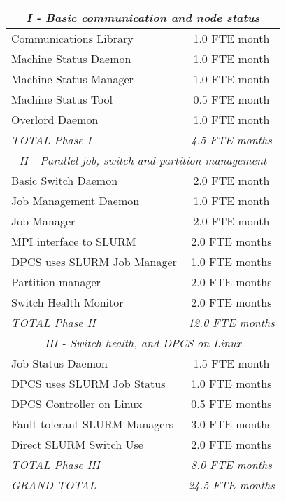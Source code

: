 \begin{center}
\begin{tabular}{|l|c|}\hline
\multicolumn{2}{|c|}{\em I - Basic communication and node status} \\ \hline
Communications Library          & 1.0 FTE month \\
Machine Status Daemon           & 1.0 FTE month \\
Machine Status Manager          & 1.0 FTE month \\
Machine Status Tool             & 0.5 FTE month \\
Overlord Daemon                 & 1.0 FTE month \\
{\em TOTAL Phase I}		& {\em 4.5 FTE months} \\ \hline
\multicolumn{2}{|c|}{\em II - Parallel job, switch and partition management} \\ \hline
Basic Switch Daemon             & 2.0 FTE month \\
Job Management Daemon           & 1.0 FTE month \\
Job Manager                     & 2.0 FTE month \\
MPI interface to SLURM          & 2.0 FTE months \\
DPCS uses SLURM Job Manager     & 1.0 FTE months \\
Partition manager               & 2.0 FTE months \\
Switch Health Monitor           & 2.0 FTE months \\
{\em TOTAL Phase II}		& {\em 12.0 FTE months} \\ \hline
\multicolumn{2}{|c|}{\em III - Switch health, and DPCS on Linux} \\ \hline
Job Status Daemon               & 1.5 FTE month \\
DPCS uses SLURM Job Status      & 1.0 FTE months \\
DPCS Controller on Linux        & 0.5 FTE months \\
Fault-tolerant SLURM Managers   & 3.0 FTE months \\
Direct SLURM Switch Use         & 2.0 FTE months \\
{\em TOTAL Phase III}		& {\em 8.0 FTE months} \\ \hline
{\em GRAND TOTAL}		& {\em 24.5 FTE months} \\ \hline
\end{tabular}
\end{center}

\appendix
\newpage

